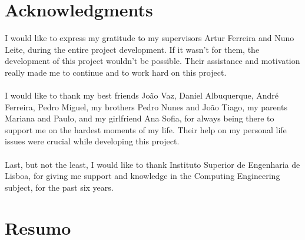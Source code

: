 \chapter*{Acknowledgments}

I would like to express my gratitude to my supervisors Artur Ferreira and Nuno Leite, during the entire project development. If it wasn't for them, the development of this project wouldn't be possible. Their assistance and motivation really made me to continue and to work hard on this project.\\
\\
I would like to thank my best friends João Vaz, Daniel Albuquerque, André Ferreira, Pedro Miguel, my brothers Pedro Nunes and João Tiago, my parents Mariana and Paulo, and my girlfriend Ana Sofia, for always being there to support me on the hardest moments of my life. Their help on my personal life issues were crucial while developing this project.\\
\\
Last, but not the least, I would like to thank Instituto Superior de Engenharia de Lisboa, for giving me support and knowledge in the Computing Engineering subject, for the past six years.
\
\chapter*{Resumo}

